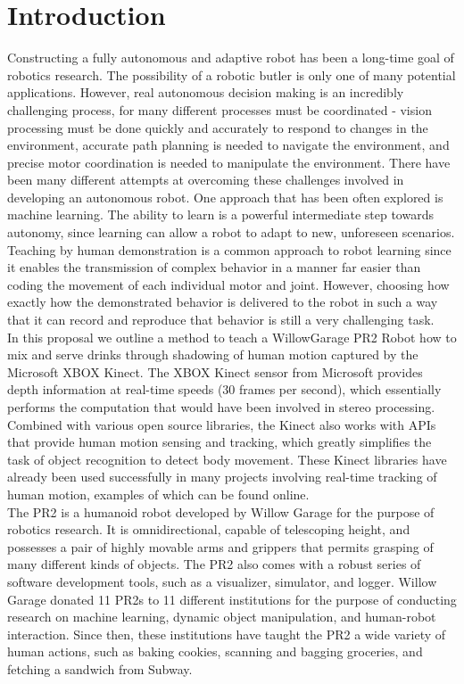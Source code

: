 \documentclass{sig-alternate}
\begin{document}
\section{Introduction}
\label{sec:intro}
Constructing a fully autonomous and adaptive robot has been a long-time goal of robotics research. The possibility of a robotic butler is only one of many potential applications. However, real autonomous decision making is an incredibly challenging process, for many different processes must be coordinated - vision processing must be done quickly and accurately to respond to changes in the environment, accurate path planning is needed to navigate the environment, and precise motor coordination is needed to manipulate the environment. There have been many different attempts at overcoming these challenges involved in developing an autonomous robot. One approach that has been often explored is machine learning. The ability to learn is a powerful intermediate step towards autonomy, since learning can allow a robot to adapt to new, unforeseen scenarios. Teaching by human demonstration is a common approach to robot learning since it enables the transmission of complex behavior in a manner far easier than coding the movement of each individual motor and joint. However, choosing how exactly how the demonstrated behavior is delivered to the robot in such a way that it can record and reproduce that behavior is still a very challenging task.\\ 

In this proposal we outline a method to teach a WillowGarage PR2 Robot how to mix and serve drinks through shadowing of human motion captured by the Microsoft XBOX Kinect. The XBOX Kinect sensor from Microsoft provides depth information at real-time speeds (30 frames per second), which essentially performs the computation that would have been involved in stereo processing. Combined with various open source libraries\cite{kinect}, the Kinect also works with APIs that provide human motion sensing and tracking, which greatly simplifies the task of object recognition to detect body movement. These Kinect libraries have already been used successfully in many projects involving real-time tracking of human motion, examples of which can be found online\cite{freenect}.\\

The PR2 is a humanoid robot developed by  Willow Garage\cite{pr2} for the purpose of robotics research. It is omnidirectional, capable of telescoping height, and possesses a pair of highly movable arms and grippers that permits grasping of many different kinds of objects. The PR2 also comes with a robust series of software development tools, such as a visualizer, simulator, and logger. Willow Garage donated 11 PR2s to 11 different institutions for the purpose of conducting research on machine learning, dynamic object manipulation, and human-robot interaction\cite{ros_pr2}. Since then, these institutions have taught the PR2 a wide variety of human actions, such as baking cookies\cite{cookies}, scanning and bagging groceries\cite{groceries}, and fetching a sandwich from Subway\cite{subway}.\\
\end{document}
